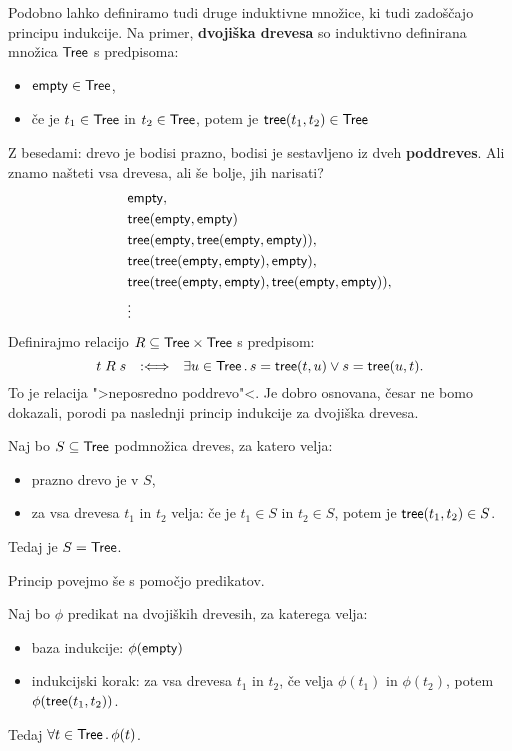 Podobno lahko definiramo tudi druge induktivne množice, ki tudi zadoščajo principu indukcije.
%
Na primer, \textbf{dvojiška drevesa} so induktivno definirana množica $\mathsf{Tree}$ s predpisoma:
%
\begin{itemize}
\item $\mathsf{empty} \in \mathsf{Tree}$,
\item če je $t_1 \in \mathsf{Tree}$ in $t_2 \in \mathsf{Tree}$, potem je $\mathsf{tree}(t_1, t_2) \in \mathsf{Tree}$
\end{itemize}
%
Z besedami: drevo je bodisi prazno, bodisi je sestavljeno iz dveh \textbf{poddreves}. Ali znamo
našteti vsa drevesa, ali še bolje, jih narisati?
%
\begin{align*}
    & \mathsf{empty}, \\
    & \mathsf{tree}(\mathsf{empty}, \mathsf{empty}) \\
    & \mathsf{tree}(\mathsf{empty}, \mathsf{tree}(\mathsf{empty}, \mathsf{empty})), \\
    & \mathsf{tree}(\mathsf{tree}(\mathsf{empty}, \mathsf{empty}), \mathsf{empty}), \\
    & \mathsf{tree}(\mathsf{tree}(\mathsf{empty}, \mathsf{empty}), \mathsf{tree}(\mathsf{empty}, \mathsf{empty})), \\
    & \vdots
\end{align*}
%
Definirajmo relacijo $R \subseteq \mathsf{Tree} \times \mathsf{Tree}$ s predpisom:
%
\begin{equation*}
  t \mathrel{R} s \quad {{:}{\Longleftrightarrow}}\quad \exists u \in \mathsf{Tree} \,.\, s = \mathsf{tree}(t, u) \lor s = \mathsf{tree}(u, t).
\end{equation*}
%
To je relacija ">neposredno poddrevo"<. Je dobro osnovana, česar ne bomo dokazali, porodi pa naslednji princip indukcije za dvojiška drevesa.

\begin{izjava}
  Naj bo $S \subseteq \mathsf{Tree}$ podmnožica dreves, za katero velja:
  \begin{itemize}
  \item prazno drevo je v $S$,
  \item za vsa drevesa $t_1$ in $t_2$ velja: če je $t_1 \in S$ in $t_2 \in S$, potem je $\mathsf{tree}(t_1, t_2) \in S$.
  \end{itemize}
  Tedaj je $S = \mathsf{Tree}$.
\end{izjava}

Princip povejmo še s pomočjo predikatov.

\begin{izjava}
  Naj bo $\phi$ predikat na dvojiških drevesih, za katerega velja:
  \begin{itemize}
  \item baza indukcije: $\phi(\mathsf{empty})$
  \item indukcijski korak: za vsa drevesa $t_1$ in $t_2$, če velja $\phi(t_1)$ in $\phi(t_2)$, potem
    $\phi(\mathsf{tree}(t_1, t_2))$.
  \end{itemize}
  Tedaj $\forall t \in \mathsf{Tree} \,.\, \phi(t)$.
\end{izjava}

